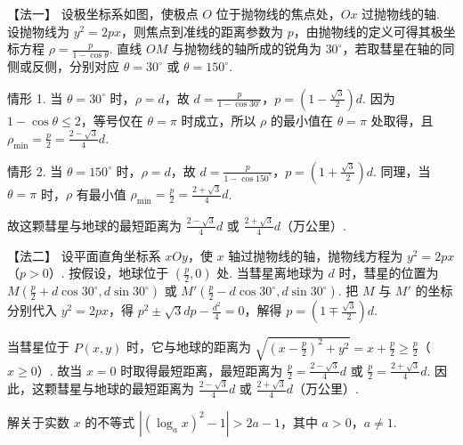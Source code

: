 \documentclass[UTF8,a4paper,oneside,11pt]{ctexbook}
\begin{document}
\begin{solution}
【法一】 设极坐标系如图，使极点 \(O\) 位于抛物线的焦点处，\(Ox\) 过抛物线的轴. 设抛物线为 \(y^2=2px\)，则焦点到准线的距离参数为 \(p\)，由抛物线的定义可得其极坐标方程 \(\rho=\frac{p}{1-\cos\theta}\). 直线 \(OM\) 与抛物线的轴所成的锐角为 \(30^{\circ}\)，若取彗星在轴的同侧或反侧，分别对应 \(\theta=30^{\circ}\) 或 \(\theta=150^{\circ}\).

情形 1. 当 \(\theta = 30^{\circ}\) 时，\(\rho = d\)，故 \(d = \frac{p}{1 - \cos 30^{\circ}}\)，\(p = \left(1 - \frac{\sqrt{3}}{2}\right)d\). 因为 \(1-\cos\theta\leqslant2\)，等号仅在 \(\theta=\pi\) 时成立，所以 \(\rho\) 的最小值在 \(\theta=\pi\) 处取得，且
\(\rho_{\min} = \frac{p}{2} = \frac{2 - \sqrt{3}}{4}d\).

情形 2. 当 \(\theta = 150^{\circ}\) 时，\(\rho = d\)，故 \(d = \frac{p}{1 - \cos 150^{\circ}}\)，\(p = \left(1 + \frac{\sqrt{3}}{2}\right)d\). 同理，当 \(\theta = \pi\) 时，\(\rho\) 有最小值
\(\rho_{\min} = \frac{p}{2} = \frac{2 + \sqrt{3}}{4}d\).

故这颗彗星与地球的最短距离为 \(\frac{2 - \sqrt{3}}{4}d\) 或 \(\frac{2 + \sqrt{3}}{4}d\)（万公里）.

【法二】 设平面直角坐标系 \(xOy\)，使 \(x\) 轴过抛物线的轴，抛物线方程为 \(y^2 = 2px\)（\(p > 0\)）. 按假设，地球位于 \(\left(\frac{p}{2},0\right)\) 处. 当彗星离地球为 \(d\) 时，彗星的位置为 \(M\left(\frac{p}{2} + d\cos 30^{\circ}, d\sin 30^{\circ}\right)\) 或 \(M'\left(\frac{p}{2} - d\cos 30^{\circ}, d\sin 30^{\circ}\right)\). 把 \(M\) 与 \(M'\) 的坐标分别代入 \(y^2 = 2px\)，得 \(p^2 \pm \sqrt{3}dp - \frac{d^2}{4} = 0\)，解得 \(p = \left(1 \mp \frac{\sqrt{3}}{2}\right)d\).

当彗星位于 \(P(x,y)\) 时，它与地球的距离为 \(\sqrt{\left(x - \frac{p}{2}\right)^2 + y^2} = x + \frac{p}{2} \geqslant \frac{p}{2}\)（\(x \geqslant 0\)）. 故当 \(x = 0\) 时取得最短距离，最短距离为 \(\frac{p}{2} = \frac{2 - \sqrt{3}}{4}d\) 或 \(\frac{p}{2} = \frac{2 + \sqrt{3}}{4}d\). 因此，这颗彗星与地球的最短距离为 \(\frac{2 - \sqrt{3}}{4}d\) 或 \(\frac{2 + \sqrt{3}}{4}d\)（万公里）.
\end{solution}

\begin{problem}
解关于实数 \(x\) 的不等式 \(\left|(\log_a x)^2 - 1\right| > 2a - 1\)，其中 \(a > 0\)，\(a \neq 1\).
\end{problem}
\end{document}
